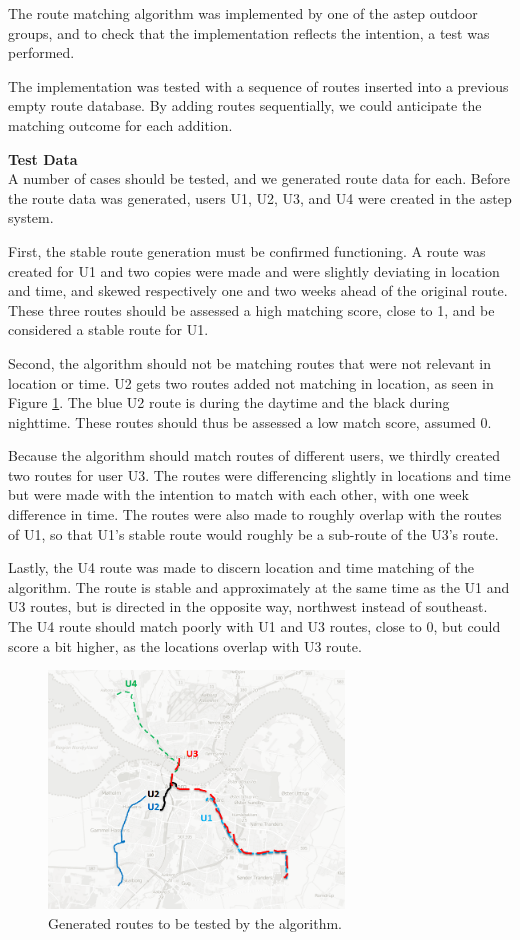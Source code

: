 The route matching algorithm was implemented by one of the \gls{astep} outdoor groups, and to check that the implementation reflects the intention, a test was performed.

The implementation was tested with a sequence of routes inserted into a previous empty route database.
By adding routes sequentially, we could anticipate the matching outcome for each addition.


\textbf{Test Data}\\
A number of cases should be tested, and we generated route data for each. 
Before the route data was generated, users U1, U2, U3, and U4 were created in the \gls{astep} system.

First, the stable route generation must be confirmed functioning.
A route was created for U1 and two copies were made and were slightly deviating in location and time, and skewed respectively one and two weeks ahead of the original route.
These three routes should be assessed a high matching score, close to 1, and be considered a stable route for U1.

Second, the algorithm should not be matching routes that were not relevant in location or time.
U2 gets two routes added not matching in location, as seen in Figure \ref{fig:algroutes}.
The blue U2 route is during the daytime and the black during nighttime.
These routes should thus be assessed a low match score, assumed 0.

Because the algorithm should match routes of different users, we thirdly created two routes for user U3.
The routes were differencing slightly in locations and time but were made with the intention to match with each other, with one week difference in time.
The routes were also made to roughly overlap with the routes of U1, so that U1's stable route would roughly be a sub-route of the U3's route.

Lastly, the U4 route was made to discern location and time matching of the algorithm.
The route is stable and approximately at the same time as the U1 and U3 routes, but is directed in the opposite way, northwest instead of southeast.
The U4 route should match poorly with U1 and U3 routes, close to 0, but could score a bit higher, as the locations overlap with U3 route.

\begin{figure}[h]
	\centering
	\includegraphics[width=0.7\textwidth]{figures/algorithmroutes.png}
	\caption{Generated routes to be tested by the algorithm.}
	\label{fig:algroutes}
\end{figure}


